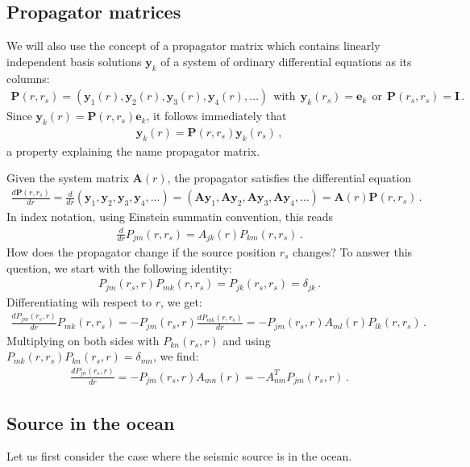 \documentclass[12pt,a4paper]{article}
\begin{document}
\subsection{Propagator matrices}
%
 We will also use the concept of a propagator matrix which contains linearly independent basis solutions $\mathbf{y}_k$ of a system of ordinary differential equations as its columns:
\begin{align}
\mathbf{P}(r,r_s) = (\mathbf{y}_1(r),\mathbf{y}_2(r),\mathbf{y}_3(r),\mathbf{y}_4(r),\ldots)\ \ 
\mathrm{with}\ \ \mathbf{y}_k(r_s) = \mathbf{e}_k \ \ 
\mathrm{or}\ \ \mathbf{P}(r_s,r_s) = \mathbf{I}\,.
\end{align}
Since $\mathbf{y}_k(r) = \mathbf{P}(r,r_s)\mathbf{e}_k$, it follows immediately that
\begin{align}
\mathbf{y}_k(r) = \mathbf{P}(r,r_s)\mathbf{y}_k(r_s) \,,
\end{align}
a property explaining the name propagator matrix.

Given the system matrix $\mathbf{A}(r)$, the propagator satisfies the differential equation
\begin{align}
\frac{d\mathbf{P}(r,r_s)}{dr} = \frac{d}{dr}(\mathbf{y}_1,\mathbf{y}_2,\mathbf{y}_3,\mathbf{y}_4,\ldots)
= (\mathbf{A}\mathbf{y}_1,\mathbf{A}\mathbf{y}_2,\mathbf{A}\mathbf{y}_3,\mathbf{A}\mathbf{y}_4,\ldots) = \mathbf{A}(r)\mathbf{P}(r,r_s)\,.
\end{align}
In index notation, using Einstein summatin convention, this reads
\begin{align}
\frac{d}{dr}P_{jm}(r,r_s) = A_{jk}(r)P_{km}(r,r_s) \,.
\end{align}
How does the propagator change if the source position $r_s$ changes? To answer this question, we start with the following identity:
\begin{align}
P_{jm}(r_s,r)P_{mk}(r,r_s) = P_{jk}(r_s,r_s) = \delta_{jk} \,.
\end{align}
Differentiating wih respect to $r$, we get:
\begin{align}
\frac{dP_{jm}(r_s,r)}{dr} P_{mk}(r,r_s) = -P_{jm}(r_s,r)\frac{dP_{mk}(r,r_s)}{dr} = -P_{jm}(r_s,r)A_{ml}(r)P_{lk}(r,r_s) \,.
\end{align}
Multiplying on both sides with $P_{kn}(r_s,r)$ and using $P_{mk}(r,r_s)P_{kn}(r_s,r)=\delta_{mn}$, we find:
\begin{align}
\frac{dP_{jn}(r_s,r)}{dr} = -P_{jm}(r_s,r)A_{mn}(r) = -A^T_{nm}P_{jm}(r_s,r)\,.
\end{align}
%
\subsection{Source in the ocean}
%
Let us first consider the case where the seismic source is in the ocean. 
\end{document}
